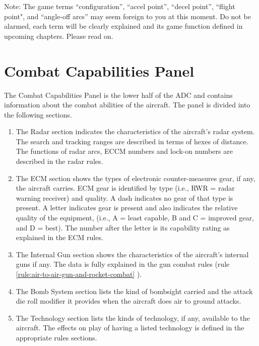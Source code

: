 Note: The game terms “configuration”, “accel point”, “decel point”, “flight point", and “angle-off arcs” may seem foreign to you at this moment. Do not be alarmed, each term will be clearly explained and its game function defined in upcoming chapters. Please read on.

\section{Combat Capabilities Panel}

The Combat Capabilities Panel is the lower half of the ADC and contains information about the combat abilities of the aircraft.  The panel is divided into the following sections.

\begin{enumerate}[resume]

    \item {}
        The Radar section indicates the characteristics of the aircraft's radar system. The search and tracking ranges are described in terms of hexes of distance. The functions of radar arcs, ECCM numbers and lock-on numbers are described in the radar rules.

    \item {}
        The ECM section shows the types of electronic counter-measures gear, if any, the aircraft carries. ECM gear is identified by type (i.e., RWR = radar warning receiver) and quality. A dash indicates no gear of that type is present. A letter indicates gear is present and also indicates the relative quality of the equipment, (i.e., A = least capable, B and C = improved gear, and D = best). The number after the letter is its capability rating as explained in the ECM rules.

    \item {}
        The Internal Gun section shows the characteristics of the aircraft's internal guns if any. The data is fully explained in the gun combat rules (rule \ref{rule:air-to-air-gun-and-rocket-combat}
        ).

    \item {}
        The Bomb System section lists the kind of bombsight carried and the attack die roll modifier it provides when the aircraft does air to ground attacks.

    \item {}
        The Technology section lists the kinds of technology, if any, available to the aircraft. The effects on play of having a listed technology is defined in the appropriate rules sections.


\end{enumerate}
